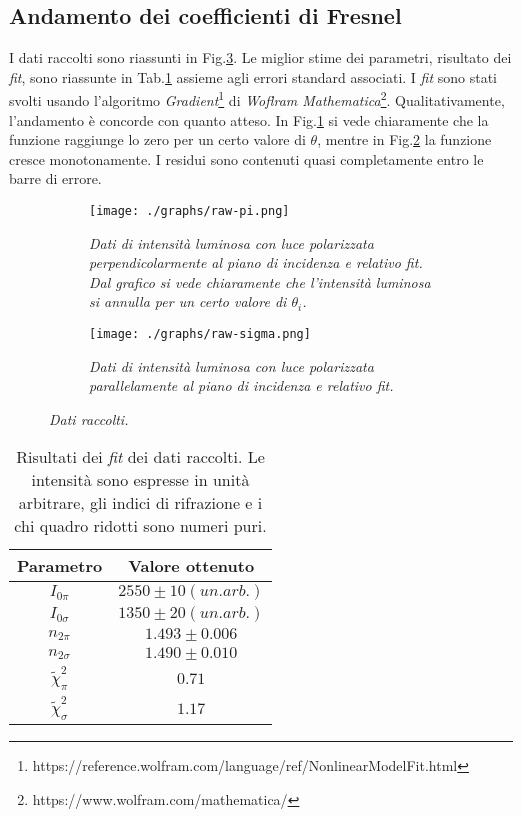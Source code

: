 \subsection{Andamento dei coefficienti di Fresnel}\label{subsec:analisi-coefficienti}
  I dati raccolti sono riassunti in Fig.\ref{fig:dati-raw}.
  Le miglior stime dei parametri, risultato dei \emph{fit}, sono riassunte in Tab.\ref{tab:risultati-fit}
  assieme agli errori standard associati.
  I \emph{fit} sono stati svolti usando l'algoritmo \emph{Gradient}\footnote{https://reference.wolfram.com/language/ref/NonlinearModelFit.html} di \emph{Woflram Mathematica}\footnote{https://www.wolfram.com/mathematica/}.
  Qualitativamente, l'andamento è concorde con quanto atteso. In Fig.\ref{fig:raw-pi}
  si vede chiaramente che la funzione raggiunge lo zero per un certo valore di $\theta$,
  mentre in Fig.\ref{fig:raw-sigma} la funzione cresce monotonamente.
  I residui sono contenuti quasi completamente entro le barre di errore.
  \begin{figure}[H]
    \centering
    \begin{subfigure}[t]{.47\textwidth}
      \texttt{[image: ./graphs/raw-pi.png]}
      \caption{
        \emph{
          Dati di intensità luminosa con luce polarizzata perpendicolarmente al
          piano di incidenza e relativo fit. Dal grafico si vede chiaramente che
          l'intensità luminosa si annulla per un certo valore di $\theta_i$.
        }
      }
      \label{fig:raw-pi}
    \end{subfigure}
    \hspace{5mm}
    \begin{subfigure}[t]{.47\textwidth}
      \texttt{[image: ./graphs/raw-sigma.png]}
      \caption{
        \emph{
          Dati di intensità luminosa con luce polarizzata parallelamente al
          piano di incidenza e relativo fit.
        }
      }
      \label{fig:raw-sigma}
    \end{subfigure}
    \caption{\emph{Dati raccolti.}
    \label{fig:dati-raw}}
  \end{figure}
  \begin{table}[H]
    \centering
    \begin{tabular}[t]{cc}
      \toprule
      Parametro &Valore ottenuto\\
      \midrule
      $I_{0\pi}$ &$2550 \pm 10 (un. arb.)$ \\
      $I_{0\sigma}$ &$1350 \pm 20 (un. arb.)$ \\
      $n_{2\pi}$ &$1.493 \pm 0.006$    \\
      $n_{2\sigma}$ &$1.490 \pm 0.010$    \\
      $\tilde \chi^2_\pi$ &$0.71$ \\
      $\tilde \chi^2_\sigma$ &$1.17$ \\
      \bottomrule
      \end{tabular}
    \caption{
      Risultati dei \emph{fit} dei dati raccolti. Le intensità sono espresse in unità arbitrare, gli indici
      di rifrazione e i chi quadro ridotti sono numeri puri.
    }
    \label{tab:risultati-fit}
  \end{table}
